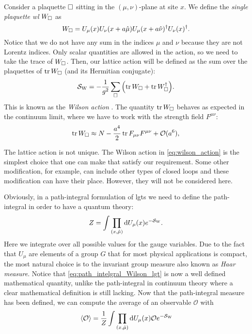 Consider a plaquette $\square$ sitting in the $(\mu, \nu)$-plane at site $x$.
We define the \emph{single plaquette \acl{wl}} $W_{\square}$ as
\begin{equation}
    W_{\square} =
    U_{\mu}(x) U_{\nu}(x + a \hat{\mu}) U_{\mu}(x + a \hat{\nu})^{\dagger} U_{\nu}(x)^{\dagger}.
    \label{eq:single_plaquette_Wilson_loop}
\end{equation}
Notice that we do not have any sum in the indices $\mu$ and $\nu$ because they are not Lorentz indices.
Only scalar quantities are allowed in the action, so we need to take the trace of $W_{\square}$.
Then, our lattice action will be defined as the sum over the plaquettes of $\tr W_{\square}$ (and its Hermitian conjugate):
\begin{equation}
    \mathcal{S}_{\text{W}} = - \frac{1}{g^2} \sum_{\square} \qty( \tr W_{\square} + \tr W_{\square}^{\dagger} ).
    \label{eq:wilson_action}
\end{equation}
This is known as the \emph{Wilson action} \citneeded.
The quantity $\tr W_{\square}$ behaves as expected in the continuum limit, where we have to work with the strength field $F^{\mu \nu}$:
\begin{equation}
    \tr W_{\square} \approx N - \frac{a^{4}}{2} \tr F_{\mu \nu} F^{\mu \nu} + \mathcal{O}(a^6),
\end{equation}

The lattice action is not unique.
The Wilson action in \eqref{eq:wilson_action} is the simplest choice that one can make that satisfy our requirement.
Some other modification, for example, can include other types of closed loops and these modification can have their place.
However, they will not be considered here.

Obviously, in a path-integral formulation of \ac{lgt}s we need to define the path-integral in order to have a quantum theory:
\begin{equation}
    Z = \int \prod_{(x, \hat{\mu})}  \dd U_{\mu}(x) e^{- \mathcal{S}_{\text{W}}}.
    \label{eq:path_intelgral_Wilson_lgt}
\end{equation}
Here we integrate over all possible values for the gauge variables.
Due to the fact that $U_{\mu}$ are elements of a group $G$ that for most physical applications is compact, the most natural choice is to the invariant group measure also known as \emph{Haar measure}.
Notice that \eqref{eq:path_intelgral_Wilson_lgt} is now a well defined mathematical quantity, unlike the path-integral in continuum theory where a clear mathematical definition is still lacking.
Now that the path-integral measure has been defined, we can compute the average of an observable $\mathcal{O}$ with
\begin{equation}
    \ev*{\mathcal{O}} = \frac{1}{Z} \int \prod_{(x, \hat{\mu})} \dd U_{\mu}(x) \mathcal{O} e^{- \Action_{\text{W}}}
\end{equation}


